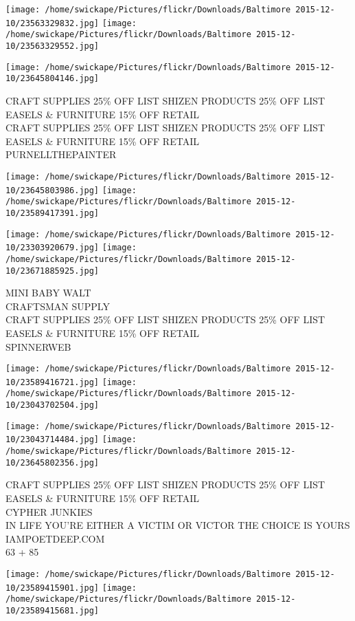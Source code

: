 \documentclass[10pt,letterpaper]{article}
\begin{document}
\texttt{[image: /home/swickape/Pictures/flickr/Downloads/Baltimore 2015-12-10/23563329832.jpg]}
\texttt{[image: /home/swickape/Pictures/flickr/Downloads/Baltimore 2015-12-10/23563329552.jpg]}

\vspace{0.25in}
\texttt{[image: /home/swickape/Pictures/flickr/Downloads/Baltimore 2015-12-10/23645804146.jpg]}

CRAFT SUPPLIES 25\% OFF LIST SHIZEN PRODUCTS 25\% OFF LIST EASELS \& FURNITURE 15\% OFF RETAIL\\
CRAFT SUPPLIES 25\% OFF LIST SHIZEN PRODUCTS 25\% OFF LIST EASELS \& FURNITURE 15\% OFF RETAIL\\
PURNELLTHEPAINTER
\pagebreak

\texttt{[image: /home/swickape/Pictures/flickr/Downloads/Baltimore 2015-12-10/23645803986.jpg]}
\texttt{[image: /home/swickape/Pictures/flickr/Downloads/Baltimore 2015-12-10/23589417391.jpg]}

\texttt{[image: /home/swickape/Pictures/flickr/Downloads/Baltimore 2015-12-10/23303920679.jpg]}
\texttt{[image: /home/swickape/Pictures/flickr/Downloads/Baltimore 2015-12-10/23671885925.jpg]}

MINI BABY WALT\\
CRAFTSMAN SUPPLY\\
CRAFT SUPPLIES 25\% OFF LIST SHIZEN PRODUCTS 25\% OFF LIST EASELS \& FURNITURE 15\% OFF RETAIL\\
SPINNERWEB
\pagebreak

\texttt{[image: /home/swickape/Pictures/flickr/Downloads/Baltimore 2015-12-10/23589416721.jpg]}
\texttt{[image: /home/swickape/Pictures/flickr/Downloads/Baltimore 2015-12-10/23043702504.jpg]}

\texttt{[image: /home/swickape/Pictures/flickr/Downloads/Baltimore 2015-12-10/23043714484.jpg]}
\texttt{[image: /home/swickape/Pictures/flickr/Downloads/Baltimore 2015-12-10/23645802356.jpg]}

CRAFT SUPPLIES 25\% OFF LIST SHIZEN PRODUCTS 25\% OFF LIST EASELS \& FURNITURE 15\% OFF RETAIL\\
CYPHER JUNKIES\\
IN LIFE YOU'RE EITHER A VICTIM OR VICTOR THE CHOICE IS YOURS IAMPOETDEEP.COM\\
63 + 85
\pagebreak

\texttt{[image: /home/swickape/Pictures/flickr/Downloads/Baltimore 2015-12-10/23589415901.jpg]}
\texttt{[image: /home/swickape/Pictures/flickr/Downloads/Baltimore 2015-12-10/23589415681.jpg]}
\end{document}
